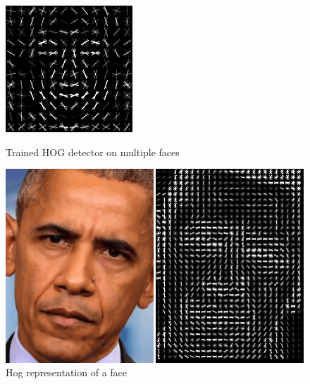 \documentclass[12pt,english]{article}
\begin{document}
\begin{figure}[!tbp]
  \centering
  \begin{minipage}[b]{0.35\textwidth}
    \includegraphics[width=\textwidth]{figures/hog_dlib.png}
    \caption{Trained HOG detector on multiple faces \cite{trigueros}}
    \label{fig:dlibhog}
  \end{minipage}
  \hfill
  \begin{minipage}[b]{0.45\textwidth}
    \includegraphics[width=\textwidth]{figures/face_hog.png}
    \caption{Hog representation of a face \cite{hackevolve}}
    \label{fig:obama}
  \end{minipage}
\end{figure}
\end{document}
